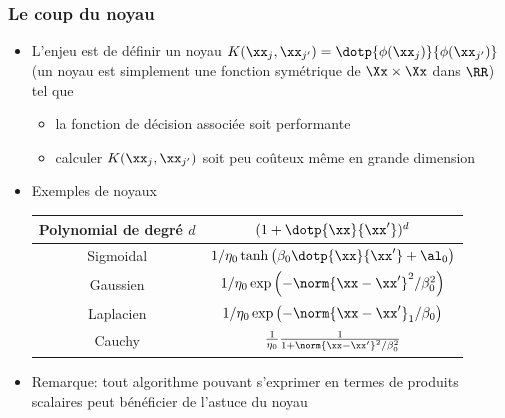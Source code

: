 \documentclass[9pt,table]{beamer} %
\begin{document}
\begin{frame}
\frametitle{Le coup du noyau}

\begin{itemize}[label=\tiny$\blacksquare$]
	\item L'enjeu est de définir un noyau $K(\xx_j,\xx_{j'}) = \dotp{\phi(\xx_j)}{\phi(\xx_{j'})}$ (un noyau est simplement une fonction symétrique de $\Xx \times \Xx$ dans $\RR$) tel que
	\begin{itemize}[label=-]
		\item la fonction de décision associée soit performante
		\item calculer $K(\xx_j,\xx_{j'})$ soit peu coûteux même en grande dimension
	\end{itemize}
		
	\item Exemples de noyaux
	\vfill
	\begin{center}
	\begin{tabular}{c|c}
		Polynomial de degré $d$ & $(1 + \dotp{\xx}{\xx'})^d$\\
		\hline
		Sigmoidal & $1/\eta_0 \tanh\left(\beta_0\dotp{\xx}{\xx'}+\al_0\right)$\\
		\hline 
		\hline
		Gaussien & $1/\eta_0 \exp\left(-\norm{\xx-\xx'}^2/\beta_0^2\right)$\\
		\hline
		Laplacien & $1/\eta_0 \exp\left(-\norm{\xx-\xx'}_1/\beta_0\right)$\\
		\hline
		Cauchy & $\frac{1}{\eta_0} \frac{1}{1+\norm{\xx-\xx'}^2/\beta_0^2}$
	\end{tabular}
	\end{center}
	
	\item Remarque: tout algorithme pouvant s'exprimer en termes de produits scalaires peut bénéficier de l'astuce du noyau
\end{itemize}
	
\end{frame}






%
%
\end{document}
